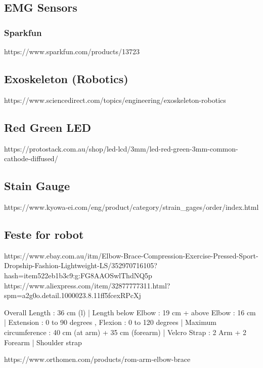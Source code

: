 \subsection{EMG Sensors}
\subsubsection{Sparkfun}
https://www.sparkfun.com/products/13723

\subsection{Exoskeleton (Robotics)}
https://www.sciencedirect.com/topics/engineering/exoskeleton-robotics

\subsection{Red Green LED}
https://protostack.com.au/shop/led-lcd/3mm/led-red-green-3mm-common-cathode-diffused/

\subsection{Stain Gauge}
https://www.kyowa-ei.com/eng/product/category/strain\_gages/order/index.html

\subsection{Feste for robot}
https://www.ebay.com.au/itm/Elbow-Brace-Compression-Exercise-Pressed-Sport-Dropship-Fashion-Lightweight-LS/352970716105?hash=item522eb1b3c9:g:FG8AAOSwlThdNQ5p
\newline
https://www.aliexpress.com/item/32877777311.html?spm=a2g0o.detail.1000023.8.11ff5fcexRPcXj
\newline

Overall Length : 36 cm (l) | Length below Elbow : 19 cm + above Elbow : 16 cm | Extension : 0 to 90 degrees , Flexion : 0 to 120 degrees | Maximum circumference : 40 cm (at arm) + 35 cm (forearm) | Velcro Strap : 2 Arm + 2 Forearm | Shoulder strap

https://www.orthomen.com/products/rom-arm-elbow-brace